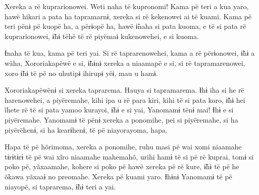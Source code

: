  

 

 

Xereka a rë kuprarionowei. Weti naha të kupronomi! Kama pë teri a kua
yaro, hawë hikari a pata ha tapramarnɨ, xereka si rë kekenowei ai të
kuami. Kama pë teri pënɨ pë kuopë ha, a përɨopë ha, hawë ɨ̃naha si pata
kuoma, e të si pata rë kuprarionowei, ɨ̃hɨ tëhë të rë
piyëmaɨ kukenowehei, e si kuoma. 

Ɨnaha të kua, kama pë teri yai. Si rë taprarenowehei, kama a rë
përɨonowei, ɨ̃hɨ a wãha, Xororiakapëwë e si, ɨ̃hɨnɨ xereka a niaamapë e
si, si rë tapramarenowei, xoro ɨ̃hɨ të pë no uhutipɨ ihirupɨ yëɨ, mau u
hamɨ. 

Xororiakapëwënɨ si xereka taprarema. Hauya si tapramarema. Ɨhɨ iha si he
rë harenowehei, a piyëremahe, kihi ipa u rë para kiri, kihi të si pata
koro, ɨ̃hɨ hei ĩhete rë të si pata yamoo kurayoi, ɨ̃hɨ e si yai,
Yanomamɨ tënɨ mai! Ɨhɨ e si piyëremahe. Yanomamɨ të pënɨ xereka a
ponomihe, pei si piyëremahe, si ha piyërëhenɨ, si ha kearɨhenɨ, të pë
niayorayoma, hapa. 

Hapa të pë hõrimoma, xereka a ponomihe, ruhu masi pë wai xomi niaamahe
tɨrɨtɨrɨ të pë wai xĩro niaamahe mahemahõ, urihi hamɨ të si pë rë
kuprai, tomɨ si poko pë, yãxaamahe, kohere si poko pë hawë xereka pë rë
kure, ɨ̃hɨ të pë he õkawa yãxaaɨ no preomahe. Xereka pë kuami yaro.
Ɨhɨnɨ Yanomamɨ të pë niayopë, si taprarema, ɨ̃hɨ teri a yai.

 


 

 

 
